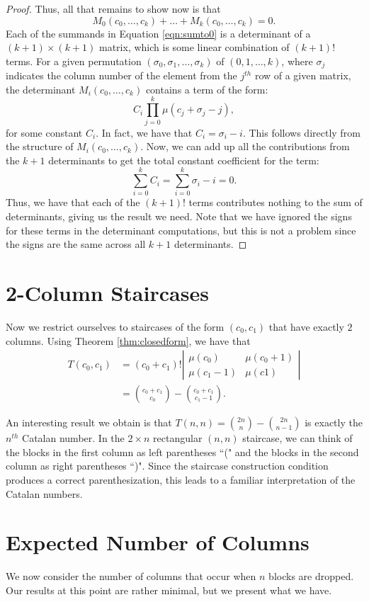 \documentclass[12pt]{amsart}
\newcommand{\M}{M}
\newcommand{\newsection}[2]{
\section{#1 \label{#2}}
}
\begin{document}
\begin{proof}
Thus, all that remains to show now is that
\begin{equation}
\M_0(c_0,\dots,c_k) + \dots + \M_k(c_0,\dots,c_k) = 0.
\label{eqn:sumto0}
\end{equation}
Each of the summands in Equation \ref{eqn:sumto0} is a determinant of a $(k+1)\times(k+1)$ matrix, which is some linear combination of $(k+1)!$ terms. For a given permutation $(\sigma_0, \sigma_1, \dots, \sigma_k)$ of $(0,1,\dots,k)$, where $\sigma_j$ indicates the column number of the element from the $j^{th}$ row of a given matrix, the determinant $\M_i(c_0, \dots, c_k)$ contains a term of the form:
$$
C_i \prod_{j=0}^{k}{\mu(c_j+\sigma_j-j)},
$$
for some constant $C_i$. In fact, we have that $C_i = \sigma_i - i$. This follows directly from the structure of $\M_i(c_0,\dots,c_k)$. Now, we can add up all the contributions from the $k+1$ determinants to get the total constant coefficient for the term:
$$
\sum_{i=0}^{k}{C_i} = \sum_{i=0}^{k}{\sigma_i-i} = 0.
$$
Thus, we have that each of the $(k+1)!$ terms contributes nothing to the sum of determinants, giving us the result we need. Note that we have ignored the signs for these terms in the determinant computations, but this is not a problem since the signs are the same across all $k+1$ determinants.
\end{proof}

\newsection{2-Column Staircases}{sec:twocolumn}
Now we restrict ourselves to staircases of the form $(c_0,c_1)$ that have exactly $2$ columns. Using Theorem \ref{thm:closedform}, we have that
\begin{align*}
T(c_0,c_1) & = (c_0 + c_1)! \left|
\begin{matrix}
\mu(c_0) & \mu(c_0 + 1) \\
\mu(c_1 - 1) & \mu(c1)
\end{matrix}\right| \\
& =\binom{c_0 + c_1}{c_0} - \binom{c_0 + c_1}{c_1 - 1}.
\end{align*}

An interesting result we obtain is that $T(n,n) = \binom{2n}{n} - \binom{2n}{n-1}$ is exactly the $n^{th}$ Catalan number. In the $2 \times n$ rectangular $(n,n)$ staircase, we can think of the blocks in the first column as left parentheses ``(" and the blocks in the second column as right parentheses ``)". Since the staircase construction condition produces a correct parenthesization, this leads to a familiar interpretation of the Catalan numbers. 

\newsection{Expected Number of Columns}{sec:expectedcolumns}
We now consider the number of columns that occur when $n$ blocks are dropped. Our results at this point are rather minimal, but we present what we have.
\end{document}
